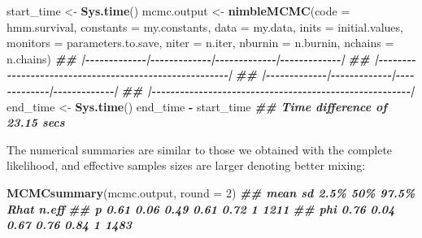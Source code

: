 \documentclass[
  12pt,
]{krantz}
\newenvironment{Shaded}{\begin{snugshade}}{\end{snugshade}}
\newcommand{\AttributeTok}[1]{\textcolor[rgb]{0.13,0.29,0.53}{#1}}
\newcommand{\DecValTok}[1]{\textcolor[rgb]{0.00,0.00,0.81}{#1}}
\newcommand{\DocumentationTok}[1]{\textcolor[rgb]{0.56,0.35,0.01}{\textbf{\textit{#1}}}}
\newcommand{\FunctionTok}[1]{\textcolor[rgb]{0.13,0.29,0.53}{\textbf{#1}}}
\newcommand{\NormalTok}[1]{#1}
\newcommand{\OtherTok}[1]{\textcolor[rgb]{0.56,0.35,0.01}{#1}}
\newcommand{\SpecialCharTok}[1]{\textcolor[rgb]{0.81,0.36,0.00}{\textbf{#1}}}
\begin{document}
\begin{Shaded}
\begin{Highlighting}[]
\NormalTok{start\_time }\OtherTok{\textless{}{-}} \FunctionTok{Sys.time}\NormalTok{()}
\NormalTok{mcmc.output }\OtherTok{\textless{}{-}} \FunctionTok{nimbleMCMC}\NormalTok{(}\AttributeTok{code =}\NormalTok{ hmm.survival,}
                          \AttributeTok{constants =}\NormalTok{ my.constants,}
                          \AttributeTok{data =}\NormalTok{ my.data,}
                          \AttributeTok{inits =}\NormalTok{ initial.values,}
                          \AttributeTok{monitors =}\NormalTok{ parameters.to.save,}
                          \AttributeTok{niter =}\NormalTok{ n.iter,}
                          \AttributeTok{nburnin =}\NormalTok{ n.burnin,}
                          \AttributeTok{nchains =}\NormalTok{ n.chains)}
\DocumentationTok{\#\# |{-}{-}{-}{-}{-}{-}{-}{-}{-}{-}{-}{-}{-}|{-}{-}{-}{-}{-}{-}{-}{-}{-}{-}{-}{-}{-}|{-}{-}{-}{-}{-}{-}{-}{-}{-}{-}{-}{-}{-}|{-}{-}{-}{-}{-}{-}{-}{-}{-}{-}{-}{-}{-}|}
\DocumentationTok{\#\# |{-}{-}{-}{-}{-}{-}{-}{-}{-}{-}{-}{-}{-}{-}{-}{-}{-}{-}{-}{-}{-}{-}{-}{-}{-}{-}{-}{-}{-}{-}{-}{-}{-}{-}{-}{-}{-}{-}{-}{-}{-}{-}{-}{-}{-}{-}{-}{-}{-}{-}{-}{-}{-}{-}{-}|}
\DocumentationTok{\#\# |{-}{-}{-}{-}{-}{-}{-}{-}{-}{-}{-}{-}{-}|{-}{-}{-}{-}{-}{-}{-}{-}{-}{-}{-}{-}{-}|{-}{-}{-}{-}{-}{-}{-}{-}{-}{-}{-}{-}{-}|{-}{-}{-}{-}{-}{-}{-}{-}{-}{-}{-}{-}{-}|}
\DocumentationTok{\#\# |{-}{-}{-}{-}{-}{-}{-}{-}{-}{-}{-}{-}{-}{-}{-}{-}{-}{-}{-}{-}{-}{-}{-}{-}{-}{-}{-}{-}{-}{-}{-}{-}{-}{-}{-}{-}{-}{-}{-}{-}{-}{-}{-}{-}{-}{-}{-}{-}{-}{-}{-}{-}{-}{-}{-}|}
\NormalTok{end\_time }\OtherTok{\textless{}{-}} \FunctionTok{Sys.time}\NormalTok{()}
\NormalTok{end\_time }\SpecialCharTok{{-}}\NormalTok{ start\_time}
\DocumentationTok{\#\# Time difference of 23.15 secs}
\end{Highlighting}
\end{Shaded}

The numerical summaries are similar to those we obtained with the complete likelihood, and effective samples sizes are larger denoting better mixing:

\begin{Shaded}
\begin{Highlighting}[]
\FunctionTok{MCMCsummary}\NormalTok{(mcmc.output, }\AttributeTok{round =} \DecValTok{2}\NormalTok{)}
\DocumentationTok{\#\#     mean   sd 2.5\%  50\% 97.5\% Rhat n.eff}
\DocumentationTok{\#\# p   0.61 0.06 0.49 0.61  0.72    1  1211}
\DocumentationTok{\#\# phi 0.76 0.04 0.67 0.76  0.84    1  1483}
\end{Highlighting}
\end{Shaded}
\end{document}

